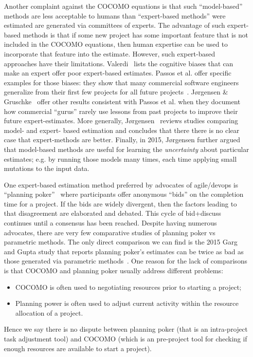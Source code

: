 \documentclass[final,twocolumn]{elsarticle}
\newcommand{\bi}{\begin{itemize}[leftmargin=0.4cm]}
\newcommand{\ei}{\end{itemize}}
\theoremstyle{break}
\begin{document}
Another complaint against the COCOMO equations is
that such ``model-based'' methods are less
acceptable to humans than ``expert-based methods''
were estimated are generated via committees of
experts. The advantage of such expert-based methods
is that if some new project has some important
feature that is not included in the COCOMO
equations, then human expertise can be used to
incorporate that feature into the estimate.
However,
such expert-based approaches have their limitations.
Valerdi~\cite{valerdi11} lists the cognitive biases
that can make an expert offer poor expert-based estimates.
Passos et al. offer specific examples for those
biases: they show that many commercial software
engineers generalize from their first few projects
for all future projects~\cite{passos11}.  J{\o}rgensen
\& Gruschke~\cite{jorgensen09} offer other results
consistent with Passos et al.  when they document
how commercial ``gurus'' rarely use lessons from
past projects to improve their future
expert-estimates.  More generally,
J{\o}rgensen~\cite{Jorgensen2004} reviews studies
comparing model- and expert- based estimation and
concludes that there there is no clear case that
expert-methods are better.  Finally, in 2015,
J{\o}rgensen further argued~\cite{jorg15} that
model-based methods are useful for learning the {\em
  uncertainty} about particular estimates; e.g.  by
running those models many times, each time applying
small mutations to the input data.

 One expert-based estimation method preferred by advocates of
 agile/devops is ``planning poker''~\cite{molokk08}
 where participants offer anonymous ``bids'' on the
 completion time for a project. If the bids are
 widely divergent, then the factors leading to that
 disagreement are elaborated and debated. This cycle
 of bid+discuss continues until a consensus has been
 reached.  Despite having numerous advocates,
 there are very few comparative studies of planning
 poker vs parametric methods. The only direct
 comparison we can find is the 2015 Garg and Gupta
 study that reports planning poker's estimates can be
 twice as bad as those generated via parametric
 methods~\cite{garg15}. One reason for the lack of
 comparisons is that COCOMO and planning poker
 usually address different problems: \bi
\item COCOMO is often used to negotiating resources prior to starting a project;
\item Planning power is often used to adjust current activity within the resource allocation of a project.
  \ei
 Hence we say  there is no dispute between planning poker (that is an intra-project
task adjustment tool) and COCOMO (which is an pre-project tool for checking if enough resources are available
to start a project).
 
\end{document}
